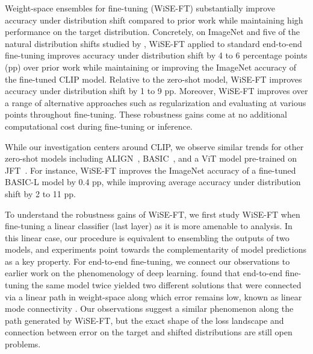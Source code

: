 Weight-space ensembles for fine-tuning (WiSE-FT) substantially improve accuracy under distribution shift compared to prior work while maintaining high performance on the target distribution.
Concretely, on ImageNet \cite{deng2009imagenet} and five of the natural distribution shifts studied by \citet{radford2021learning}, WiSE-FT applied to standard end-to-end fine-tuning improves accuracy under distribution shift by 4 to 6 percentage points (pp) over prior work while maintaining or improving the ImageNet accuracy of the fine-tuned CLIP model.
Relative to the zero-shot model, WiSE-FT improves accuracy under distribution shift by 1 to 9 pp.
Moreover, WiSE-FT improves over a range of alternative approaches such as regularization and evaluating at various points throughout fine-tuning.
These robustness gains come at no additional computational cost during fine-tuning or inference.

While our investigation centers around CLIP, we observe similar trends for other zero-shot models including ALIGN~\cite{jia2021scaling}, BASIC~\cite{pham2021scaling}, and a ViT model pre-trained on JFT~\cite{dosovitskiy2021an}.
For instance, WiSE-FT improves the ImageNet accuracy of a fine-tuned BASIC-L model by 0.4 pp, while improving average accuracy under distribution shift by 2 to 11 pp.


To understand the robustness gains of WiSE-FT, we first study WiSE-FT when fine-tuning a linear classifier (last layer) as it is more amenable to analysis. In this linear case, our procedure is equivalent to ensembling the outputs of two models, and experiments point towards the complementarity of model predictions as a key property.
For end-to-end fine-tuning, we connect our observations  to earlier work on the phenomenology of deep learning.
\citet{neyshabur2020being} found that end-to-end fine-tuning the same model twice yielded two different solutions that were connected via a linear path in weight-space along which error remains low, known as linear mode connectivity \cite{frankle2020linear}.
Our observations suggest a similar phenomenon along the path generated by WiSE-FT, but the exact shape of the loss landscape and connection between error on the target and shifted distributions are still open problems.


